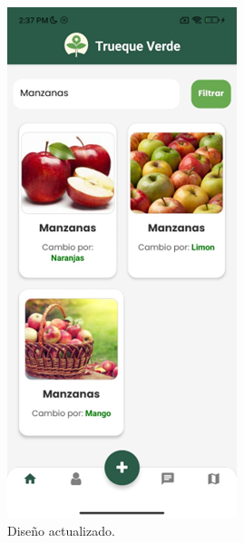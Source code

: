 \documentclass[11pt, a4paper, oneside]{book}
\begin{document}
\begin{figure} [H]
    \hfill
    \begin{minipage}{0.40\textwidth} 
        \centering
        \includegraphics[width=\textwidth]{Pictures/Imagen5.png}
        \caption{Diseño actualizado.}
    \end{minipage}
\end{figure}
\end{document}
